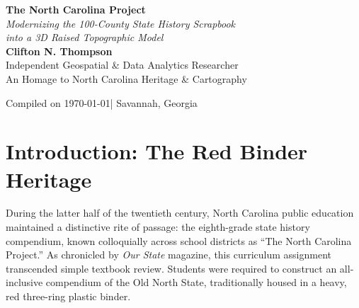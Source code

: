 \documentclass[11pt,letterpaper]{article}
\begin{document}
\begin{titlepage}
    \centering
    \vspace*{1.5cm}
    
    {\Huge \bfseries \color{CommandNavy} The North Carolina Project}\\[0.4cm]
    {\Large \itshape \color{CharcoalSlate} Modernizing the 100-County State History Scrapbook\\into a 3D Raised Topographic Model}\\[1.5cm]
    
    \textbf{\large Clifton N. Thompson}\\[0.2cm]
    \textcolor{CharcoalSlate}{\normalsize Independent Geospatial \& Data Analytics Researcher}\\[0.1cm]
    \textcolor{CadetGreen}{\normalsize An Homage to North Carolina Heritage \& Cartography}\\[2.0cm]

    \begin{abstract}
    \noindent For generations of North Carolina public school students, the ``North Carolina Project'' was an exhaustive, tactile educational crucible. Bound within red three-ring vinyl binders, students cataloged all one hundred counties across the state's three physiographic divisions---the Mountains, the Piedmont, and the Coastal Plain. This paper documents the architecture, cartographic theory, and geospatial engineering required to transform that nostalgic schoolhouse artifact into a hardware-accelerated, true-scale 3D raised relief model. Combining authoritative US Census TIGER boundary geometries, AWS Terrarium Digital Elevation Models (DEMs), Wikidata SPARQL semantic triples, and Wikimedia pageview metrics, the resulting system isolates North Carolina as a physical, thermoformed gallery model rendered directly in WebGL.
    \end{abstract}

    \vfill
    {\footnotesize \color{CharcoalSlate} Compiled on \today \quad | \quad Savannah, Georgia}
\end{titlepage}

\newpage
\tableofcontents
\newpage

\section{Introduction: The Red Binder Heritage}

During the latter half of the twentieth century, North Carolina public education maintained a distinctive rite of passage: the eighth-grade state history compendium, known colloquially across school districts as ``The North Carolina Project.'' As chronicled by \emph{Our State} magazine, this curriculum assignment transcended simple textbook review. Students were required to construct an all-inclusive compendium of the Old North State, traditionally housed in a heavy, red three-ring plastic binder.
\end{document}
